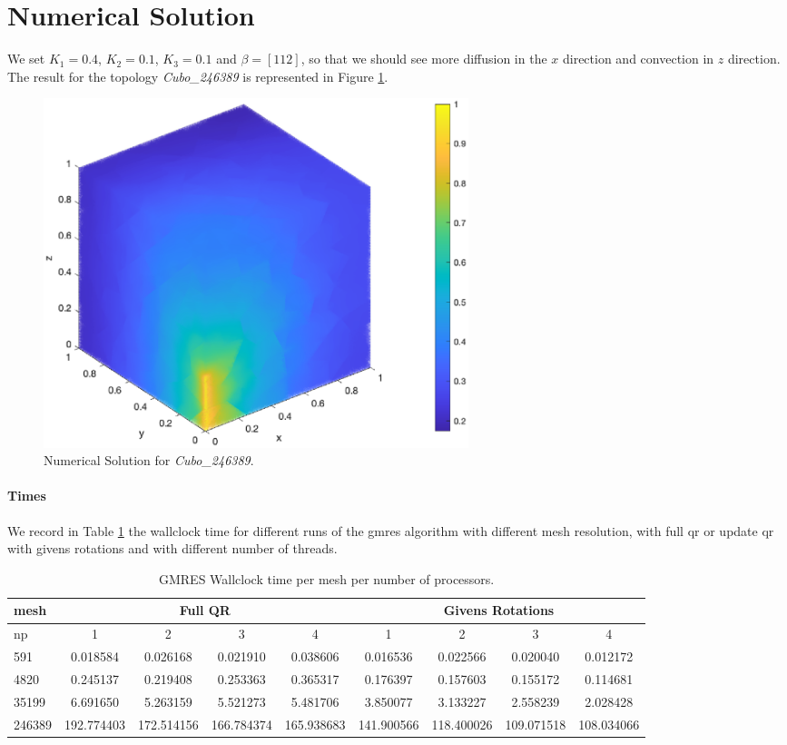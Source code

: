 \documentclass[hidelinks]{article}
\begin{document}
\section{Numerical Solution}
We set $K_1 = 0.4$, $K_2 = 0.1$, $K_3 = 0.1$ and $\beta = [1 1 2]$, so that we should see more diffusion in the $x$ direction and convection in $z$ direction. The result for the topology \emph{Cubo\_246389} is represented in Figure \ref{fig:numericalsol}.

\begin{figure}[H]
    \centering
    \includegraphics[width= 0.6\textwidth]{pic/sol246389.eps}
    \caption{Numerical Solution for \emph{Cubo\_246389}.}\label{fig:numericalsol} 
\end{figure}

\paragraph{Times}
We record in Table \ref{tab:gmrestime} the wallclock time for different runs of the gmres algorithm with different mesh resolution, with full qr or update qr with givens rotations and with different number of threads.

\begin{table}[H]
    \centering

    \begin{tabular}{|l|cccc|cccc|}
        \hline
        mesh     & \multicolumn{4}{c|}{Full QR}           & \multicolumn{4}{c|}{Givens Rotations}   \\ \hline
        np       & 1 & 2 & 3 & 4                                & 1        & 2        & 3        & 4                     \\ \hline
        591      & 0.018584 & 0.026168 & 0.021910 & 0.038606    & 0.016536 & 0.022566 & 0.020040 & 0.012172              \\
        4820     & 0.245137 & 0.219408 & 0.253363 & 0.365317    & 0.176397 & 0.157603 & 0.155172 & 0.114681              \\
        35199    & 6.691650 & 5.263159 & 5.521273 & 5.481706    & 3.850077 & 3.133227 & 2.558239 & 2.028428             \\
        246389   & 192.774403 & 172.514156 & 166.784374 & 165.938683    & 141.900566  & 118.400026 & 109.071518 & 108.034066             \\ \hline
    \end{tabular}
    \caption{GMRES Wallclock time per mesh per number of processors.}\label{tab:gmrestime}
\end{table}
\end{document}
